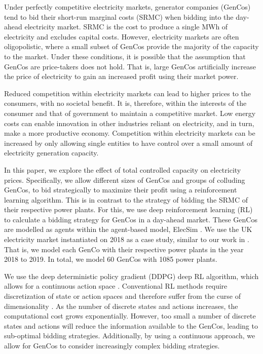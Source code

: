 \documentclass[conference]{IEEEtran}
\begin{document}
Under perfectly competitive electricity markets, generator companies (GenCos) tend to bid their short-run marginal costs (SRMC) when bidding into the day-ahead electricity market. SRMC is the cost to produce a single MWh of electricity and excludes capital costs. However, electricity markets are often oligopolistic, where a small subset of GenCos provide the majority of the capacity to the market. Under these conditions, it is possible that the assumption that GenCos are price-takers does not hold. That is, large GenCos artificially increase the price of electricity to gain an increased profit using their market power. 

Reduced competition within electricity markets can lead to higher prices to the consumers, with no societal benefit. It is, therefore, within the interests of the consumer and that of government to maintain a competitive market. Low energy costs can enable innovation in other industries reliant on electricity, and in turn, make a more productive economy. Competition within electricity markets can be increased by only allowing single entities to have control over a small amount of electricity generation capacity.

In this paper, we explore the effect of total controlled capacity on electricity prices. Specifically, we allow different sizes of GenCos and groups of colluding GenCos, to bid strategically to maximize their profit using a reinforcement learning algorithm. This is in contrast to the strategy of bidding the SRMC of their respective power plants. For this, we use deep reinforcement learning (RL) to calculate a bidding strategy for GenCos in a day-ahead market. These GenCos are modelled as agents within the agent-based model, ElecSim \cite{Kell, Kell2020}. We use the UK electricity market instantiated on 2018 as a case study, similar to our work in \cite{Kell2019a}. That is, we model each GenCo with their respective power plants in the year 2018 to 2019. In total, we model 60 GenCos with 1085 power plants.

We use the deep deterministic policy gradient (DDPG) deep RL algorithm, which allows for a continuous action space \cite{Hunt2016}. Conventional RL methods require discretization of state or action spaces and therefore suffer from the curse of dimensionality \cite{Ye2020a}. As the number of discrete states and actions increases, the computational cost grows exponentially. However, too small a number of discrete states and actions will reduce the information available to the GenCos, leading to sub-optimal bidding strategies. Additionally, by using a continuous approach, we allow for GenCos to consider increasingly complex bidding strategies. 
\end{document}
